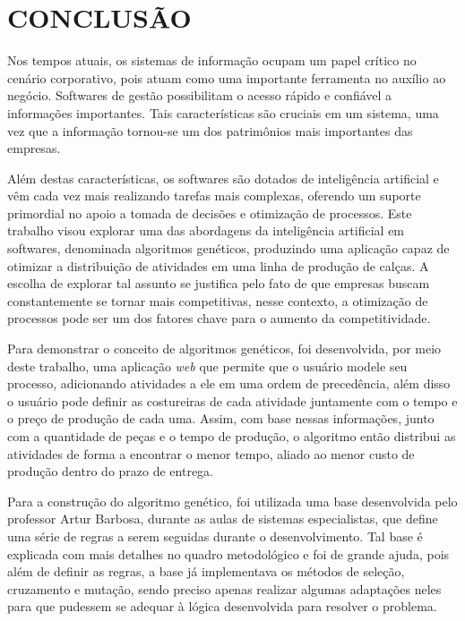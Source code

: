 
\chapter{CONCLUSÃO} 

\par Nos tempos atuais, os sistemas de informação ocupam um papel crítico no cenário corporativo, pois
atuam como uma importante ferramenta no auxílio ao negócio. Softwares de gestão possibilitam
o acesso rápido e confiável a informações importantes. Tais características são cruciais em um sistema, uma vez que a 
informação tornou-se um dos patrimônios mais importantes das empresas. 

\par Além destas características, os softwares são dotados de inteligência artificial e vêm cada vez 
mais realizando tarefas mais complexas, oferendo um suporte primordial no apoio a tomada de decisões e otimização 
de processos. Este trabalho visou explorar uma das abordagens da inteligência artificial em softwares, denominada 
algoritmos genéticos, produzindo uma aplicação capaz de otimizar a distribuição de atividades em uma linha de produção 
de calças. A escolha de explorar tal assunto se justifica pelo fato de que empresas buscam constantemente se tornar mais 
competitivas, nesse contexto, a otimização de processos pode ser um dos fatores chave para o aumento da competitividade.

\par Para demonstrar o conceito de algoritmos genéticos, foi desenvolvida, por meio deste trabalho, uma aplicação 
\textit{web} que permite que o usuário modele seu processo, adicionando atividades a ele em uma ordem de precedência,
além disso o usuário pode definir as costureiras de cada atividade juntamente com o tempo e o preço de produção de cada uma. Assim, 
com base nessas informações, junto com a quantidade de peças e o tempo de produção, o algoritmo então distribui as atividades de 
forma a encontrar o menor tempo, aliado ao menor custo de produção dentro do prazo de entrega. 

\par Para a construção do algoritmo genético, foi utilizada uma base desenvolvida pelo professor Artur Barbosa, 
durante as aulas de sistemas especialistas, que define uma série de regras a serem seguidas durante o desenvolvimento. 
Tal base é explicada com mais detalhes no quadro metodológico e foi de grande ajuda, pois além de definir as
regras, a base já implementava os métodos de seleção, cruzamento e mutação, sendo preciso apenas realizar algumas 
adaptações neles para que pudessem se adequar à lógica desenvolvida para resolver o problema.

